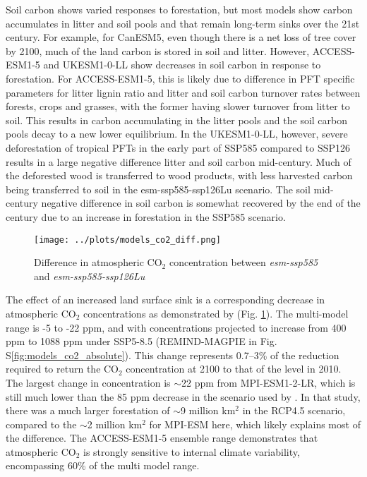 \documentclass[]{article}
\begin{document}
Soil carbon shows varied responses to forestation, but most models show carbon accumulates in litter and soil pools and that remain long-term sinks over the 21st century.
For example, for CanESM5, even though there is a net loss of tree cover by 2100, much of the land carbon is stored in soil and litter.
However, ACCESS-ESM1-5 and UKESM1-0-LL show decreases in soil carbon in response to forestation.
For ACCESS-ESM1-5, this is likely due to difference in PFT specific parameters for litter lignin ratio and litter and soil carbon turnover rates between forests, crops and grasses, with the former having slower turnover from litter to soil.
This results in carbon accumulating in the litter pools and the soil carbon pools decay to a new lower equilibrium.
In the UKESM1-0-LL, however, severe deforestation of tropical PFTs in the early part of SSP585 compared to SSP126 results in a large negative difference litter and soil carbon mid-century.
Much of the deforested wood is transferred to wood products, with less harvested carbon being transferred to soil in the esm-ssp585-ssp126Lu scenario.
The soil mid-century negative difference in soil carbon is somewhat recovered
by the end of the century due to an increase in forestation in the SSP585 scenario.

\begin{figure}
    \centering
    \texttt{[image: ../plots/models\_co2\_diff.png]}
    \caption{Difference in atmospheric CO$_2$ concentration between \textit{esm-ssp585} and \textit{esm-ssp585-ssp126Lu}}
    \label{fig:models_CO2}
\end{figure}

The effect of an increased land surface sink is a corresponding decrease in atmospheric CO$_2$ concentrations as demonstrated by (Fig. \ref{fig:models_CO2}).
The multi-model range is -5 to -22 ppm, and with concentrations projected to increase from 400 ppm to 1088 ppm under SSP5-8.5 (REMIND-MAGPIE in Fig. S\ref{fig:models_co2_absolute}).
This change represents 0.7–3\% of the reduction required to return the CO$_2$ concentration at 2100 to that of the level in 2010.
The largest change in concentration is $\sim$22 ppm from MPI-ESM1-2-LR, which is still much lower than the 85 ppm decrease in the scenario used by \cite{sonntag_reforestation_2016}.
In that study, there was a much larger forestation of $\sim$9 million km$^2$ in the RCP4.5 scenario, compared to the $\sim$2 million km$^2$ for MPI-ESM here, which likely explains most of the difference.
The ACCESS-ESM1-5 ensemble range demonstrates that atmospheric CO$_2$ is strongly sensitive to internal climate variability, encompassing 60\% of the multi model range.
\end{document}
